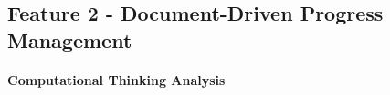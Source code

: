 \endgroup







\subsection*{Feature 2 - Document-Driven Progress Management}

\label{sec:feature-2}



\paragraph*{Computational Thinking Analysis}

